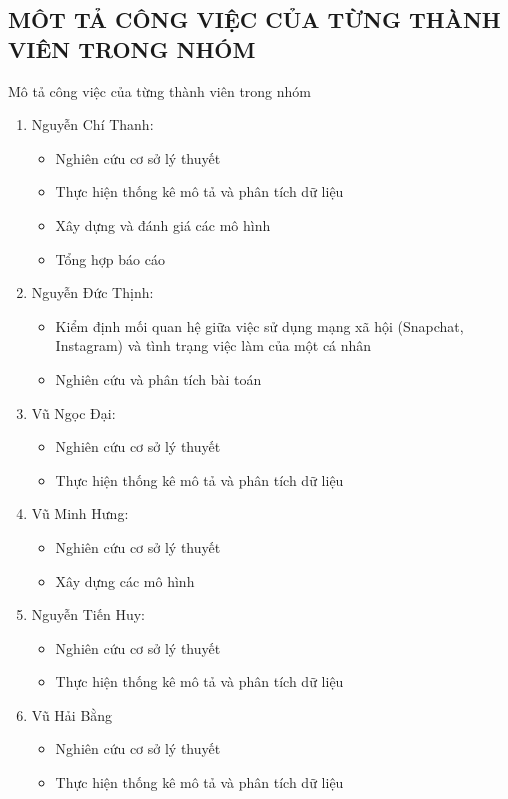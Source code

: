\newpage
\begin{center}
    \section*{MÔT TẢ CÔNG VIỆC CỦA TỪNG THÀNH VIÊN TRONG NHÓM}
\end{center}

Mô tả công việc của từng thành viên trong nhóm

\begin{enumerate}
    \item Nguyễn Chí Thanh:
    \begin{itemize}
        \item Nghiên cứu cơ sở lý thuyết
        \item Thực hiện thống kê mô tả và phân tích dữ liệu 
        \item Xây dựng và đánh giá các mô hình
        \item Tổng hợp báo cáo
    \end{itemize}
    \item Nguyễn Đức Thịnh:
    \begin{itemize}
        \item Kiểm định mối quan hệ giữa việc sử dụng mạng xã hội (Snapchat, Instagram) và tình trạng việc làm của một cá nhân
        \item Nghiên cứu và phân tích bài toán
    \end{itemize}
    \item Vũ Ngọc Đại:
    \begin{itemize}
        \item Nghiên cứu cơ sở lý thuyết
        \item Thực hiện thống kê mô tả và phân tích dữ liệu 
    \end{itemize}
    \item Vũ Minh Hưng:
    \begin{itemize}
        \item Nghiên cứu cơ sở lý thuyết
        \item Xây dựng các mô hình
    \end{itemize}
    \item Nguyễn Tiến Huy:
    \begin{itemize}
        \item Nghiên cứu cơ sở lý thuyết
        \item Thực hiện thống kê mô tả và phân tích dữ liệu 
    \end{itemize}
    \item Vũ Hải Bằng
    \begin{itemize}
        \item Nghiên cứu cơ sở lý thuyết
        \item Thực hiện thống kê mô tả và phân tích dữ liệu 
    \end{itemize}
\end{enumerate}

